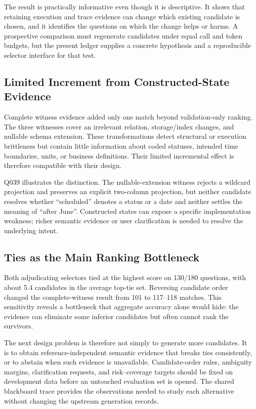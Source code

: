 \documentclass[applsci,article,submit,moreauthors]{Definitions/mdpi}
\begin{document}
The result is practically informative even though it is descriptive. It shows that retaining execution and trace evidence can change which existing candidate is chosen, and it identifies the questions on which the change helps or harms. A prospective comparison must regenerate candidates under equal call and token budgets, but the present ledger supplies a concrete hypothesis and a reproducible selector interface for that test.

\subsection{Limited Increment from Constructed-State Evidence}

Complete witness evidence added only one match beyond validation-only ranking. The three witnesses cover an irrelevant relation, storage/index changes, and nullable schema extension. These transformations detect structural or execution brittleness but contain little information about coded statuses, intended time boundaries, units, or business definitions. Their limited incremental effect is therefore compatible with their design.

Q039 illustrates the distinction. The nullable-extension witness rejects a wildcard projection and preserves an explicit two-column projection, but neither candidate resolves whether ``scheduled'' denotes a status or a date and neither settles the meaning of ``after June''. Constructed states can expose a specific implementation weakness; richer semantic evidence or user clarification is needed to resolve the underlying intent.

\subsection{Ties as the Main Ranking Bottleneck}

Both adjudicating selectors tied at the highest score on 130/180 questions, with about 5.4 candidates in the average top-tie set. Reversing candidate order changed the complete-witness result from 101 to 117--118 matches. This sensitivity reveals a bottleneck that aggregate accuracy alone would hide: the evidence can eliminate some inferior candidates but often cannot rank the survivors.

The next design problem is therefore not simply to generate more candidates. It is to obtain reference-independent semantic evidence that breaks ties consistently, or to abstain when such evidence is unavailable. Candidate-order rules, ambiguity margins, clarification requests, and risk--coverage targets should be fixed on development data before an untouched evaluation set is opened. The shared blackboard trace provides the observations needed to study each alternative without changing the upstream generation records.
\end{document}

